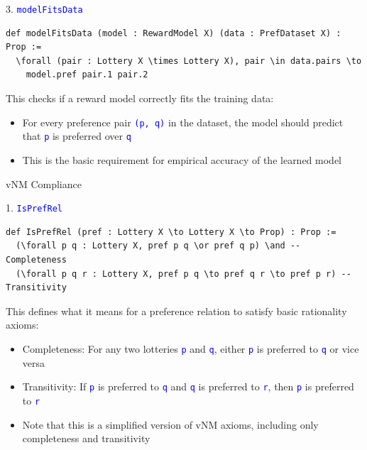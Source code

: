 \documentclass{article}
\theoremstyle{definition}
\newcommand{\tactic}[1]{\textcolor{blue}{\texttt{#1}}}
\begin{document}
3. \tactic{modelFitsData}
\begin{lstlisting}
def modelFitsData (model : RewardModel X) (data : PrefDataset X) : Prop :=
  \forall (pair : Lottery X \times Lottery X), pair \in data.pairs \to
    model.pref pair.1 pair.2
\end{lstlisting}
This checks if a reward model correctly fits the training data:
\begin{itemize}
  \item For every preference pair \tactic{(p, q)} in the dataset, the model should predict that \tactic{p} is preferred over \tactic{q}
  \item This is the basic requirement for empirical accuracy of the learned model
\end{itemize}

vNM Compliance

1. \tactic{IsPrefRel}
\begin{lstlisting}
def IsPrefRel (pref : Lottery X \to Lottery X \to Prop) : Prop :=
  (\forall p q : Lottery X, pref p q \or pref q p) \and -- Completeness
  (\forall p q r : Lottery X, pref p q \to pref q r \to pref p r) -- Transitivity
\end{lstlisting}
This defines what it means for a preference relation to satisfy basic rationality axioms:
\begin{itemize}
  \item Completeness: For any two lotteries \tactic{p} and \tactic{q}, either \tactic{p} is preferred to \tactic{q} or vice versa
  \item Transitivity: If \tactic{p} is preferred to \tactic{q} and \tactic{q} is preferred to \tactic{r}, then \tactic{p} is preferred to \tactic{r}
  \item Note that this is a simplified version of vNM axioms, including only completeness and transitivity
\end{itemize}
\end{document}
